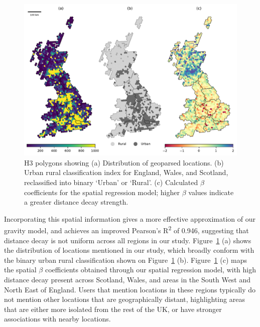 \documentclass[
  letterpaper,
  11pt,
  english,
  onehalfspacing,
  headsepline]{MastersDoctoralThesis}
\begin{document}
\begin{figure}

{\centering \includegraphics{04_connections/04_figures/fig-mixed-map-output-1.pdf}

}

\caption{\label{fig-mixed-map}H3 polygons showing (a) Distribution of
geoparsed locations. (b) Urban rural classification index for England,
Wales, and Scotland, reclassified into binary `Urban' or `Rural'. (c)
Calculated \(\beta\) coefficients for the spatial regression model;
higher \(\beta\) values indicate a greater distance decay strength.}

\end{figure}

Incorporating this spatial information gives a more effective
approximation of our gravity model, and achieves an improved Pearson's
R\textsuperscript{2} of 0.946, suggesting that distance decay is not
uniform across all regions in our study. Figure~\ref{fig-mixed-map} (a)
shows the distribution of locations mentioned in our study, which
broadly conform with the binary urban rural classification shown on
Figure~\ref{fig-mixed-map} (b). Figure~\ref{fig-mixed-map} (c) maps the
spatial \(\beta\) coefficients obtained through our spatial regression
model, with high distance decay present across Scotland, Wales, and
areas in the South West and North East of England. Users that mention
locations in these regions typically do not mention other locations that
are geographically distant, highlighting areas that are either more
isolated from the rest of the UK, or have stronger associations with
nearby locations.
\end{document}
